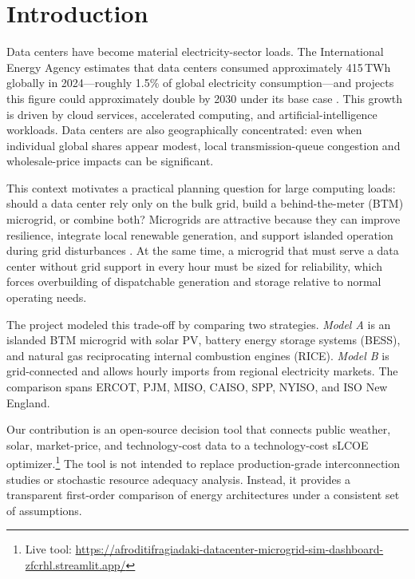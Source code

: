 \documentclass[conference]{IEEEtran}
\begin{document}
\section{Introduction}
\label{sec:intro}

Data centers have become material electricity-sector loads.
The International Energy Agency estimates that data centers consumed
approximately 415\,TWh globally in 2024---roughly 1.5\% of global electricity
consumption---and projects this figure could approximately double by 2030
under its base case \cite{b1}.
This growth is driven by cloud services, accelerated computing, and
artificial-intelligence workloads.
Data centers are also geographically concentrated: even when individual global
shares appear modest, local transmission-queue congestion and wholesale-price
impacts can be significant.

This context motivates a practical planning question for large computing
loads: should a data center rely only on the bulk grid, build a
behind-the-meter (BTM) microgrid, or combine both?
Microgrids are attractive because they can improve resilience, integrate local
renewable generation, and support islanded operation during grid
disturbances \cite{b2}.
At the same time, a microgrid that must serve a data center without grid
support in every hour must be sized for reliability, which forces overbuilding
of dispatchable generation and storage relative to normal operating needs.

The project modeled this trade-off by comparing two strategies.
\emph{Model A} is an islanded BTM microgrid with solar PV, battery energy
storage systems (BESS), and natural gas reciprocating internal combustion
engines (RICE).
\emph{Model B} is grid-connected and allows hourly imports from regional
electricity markets.
The comparison spans ERCOT, PJM, MISO, CAISO, SPP, NYISO, and ISO New England.

Our contribution is an open-source decision tool that connects public weather,
solar, market-price, and technology-cost data to a technology-cost sLCOE
optimizer.\footnote{Live tool:
\url{https://afroditifragiadaki-datacenter-microgrid-sim-dashboard-zfcrhl.streamlit.app/}}
The tool is not intended to replace production-grade interconnection studies
or stochastic resource adequacy analysis.
Instead, it provides a transparent first-order comparison of energy
architectures under a consistent set of assumptions.

\end{document}
